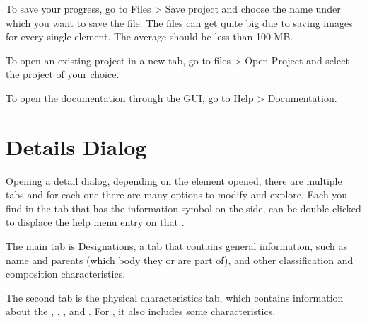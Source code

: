 \documentclass[letterpaper,10pt,english]{sphinxmanual}
\begin{document}
\sphinxAtStartPar
To save your progress, go to Files \sphinxhyphen{}\textgreater{} Save project and choose the name under
which you want to save the file. The files can get quite big due to saving
images for every single element. The average {\hyperref[\detokenize{celestial_systems/stellar_system:id1}]{}}
should be less than 100 MB.

\sphinxAtStartPar
To open an existing project in a new tab, go to files \sphinxhyphen{}\textgreater{} Open Project and
select the project of your choice.

\sphinxAtStartPar
To open the documentation through the GUI, go to Help \sphinxhyphen{}\textgreater{} Documentation.


\section{Details Dialog}
\label{\detokenize{gui/gui:details-dialog}}
\sphinxAtStartPar
Opening a detail dialog, depending on the element opened, there
are multiple tabs and for each one there are many options to modify and explore.
Each {\hyperref[\detokenize{quantities/quantities:id1}]{}} you find in the tab that has the information
symbol on the side, can be double clicked to displace the help menu entry on that
{\hyperref[\detokenize{quantities/quantities:id1}]{}}.

\sphinxAtStartPar
The main tab is Designations, a tab that contains general information,
such as name and parents (which body they {\hyperref[\detokenize{quantities/orbital/orbital:id1}]{}} or are part of),
and other classification and composition characteristics.

\sphinxAtStartPar
The second tab is the physical characteristics tab, which contains
information about the {\hyperref[\detokenize{quantities/material/mass:id1}]{}}, {\hyperref[\detokenize{quantities/geometric/radius:id1}]{}}, {\hyperref[\detokenize{quantities/rotational/spin_period:id1}]{}}, and {\hyperref[\detokenize{quantities/life/age:id1}]{}}.
For {\hyperref[\detokenize{celestial_bodies/star:id1}]{}}, it also includes some {\hyperref[\detokenize{quantities/surface/emission/emission:id1}]{}} characteristics.
\end{document}
